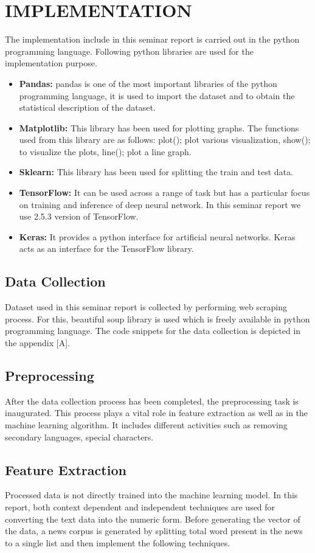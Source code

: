 \chapter{IMPLEMENTATION}
The implementation include in this seminar report is carried out in the python programming language. Following python libraries are used for the implementation purpose.
\begin{itemize}
  \item {\textbf{Pandas:} pandas is one of the most important libraries of the python programming language, it is used to import the dataset and to obtain the statistical description of the dataset.}
  \item {\textbf{Matplotlib:} This library has been used for plotting graphs. The functions used from this library are as follows: plot(); plot various visualization, show(); to visualize the plots, line(); plot a line graph.}
  \item {\textbf{Sklearn:} This library has been used for splitting the train and test data.}
  \item{\textbf{TensorFlow:} It can be used across a range of task but has a particular focus on training and inference of deep neural network. In this seminar report we use 2.5.3 version of TensorFlow.}
  \item{\textbf{Keras:} It provides a python interface for artificial neural networks. Keras acts as an interface for the TensorFlow library.
  }
\end{itemize}





\section{Data Collection}
Dataset used in this seminar report is collected by performing web scraping process. For this, beautiful soup library is used which is freely available in python programming language. The code snippets for the data collection is depicted in the appendix [A]. 
\section{Preprocessing}
After the data collection process has been completed, the preprocessing task is inaugurated. This process plays a vital role in feature extraction as well as in the machine learning algorithm. It includes different activities such as removing secondary languages, special characters.
\section{Feature Extraction}
Processed data is not directly trained into the machine learning model. In this report, both context dependent and independent techniques are used for converting the text data into the numeric form. Before generating the vector of the data, a news corpus is generated by splitting total word present in the news to a single list and then implement the following techniques.
